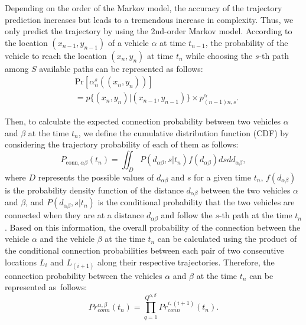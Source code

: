 \documentclass[sensors,article,accept,moreauthors,pdftex]{Definitions/mdpi}
\begin{document}
Depending on the order of the Markov model, the accuracy of the trajectory prediction increases but leads to a tremendous increase in complexity. 
Thus, we only predict the trajectory by using the 2nd-order Markov model.
According to the location $(x_{n-1}, y_{n-1})$ of a vehicle $\alpha$ at time $t_{n-1}$, the probability of the vehicle to reach the location $(x_{n}, y_{n})$ at time $t_{n}$ while choosing the $s$-th path among $S$ available paths can be represented as follows:
\begin{equation}
    \begin{split}
        & \mathrm{Pr}[\alpha^{s}_{n}((x_{n},y_{n}))]\\
        & =p\{(x_{n}, y_{n})\vert (x_{n-1}, y_{n-1})\} \times p^{\alpha}_{(n-1)n, s}.
    \end{split}
\end{equation}

Then, to calculate the expected connection probability between two vehicles $\alpha$ and $\beta$ at the time $t_{n}$, we define the cumulative distribution function (CDF) by considering the trajectory probability of each of them as follows:
\begin{equation}
P_{\mathrm{conn},\alpha\beta}(t_{n}) = \iint_{D} P(d_{\alpha\beta}, s|t_n) f(d_{\alpha\beta})ds dd_{\alpha\beta},
\end{equation}
where $D$ represents the possible values of $d_{\alpha\beta}$ and $s$ for a given time $t_n$, $f(d_{\alpha\beta})$ is the probability density function of the distance $d_{\alpha\beta}$ between the two vehicles $\alpha$ and $\beta$, and $P(d_{\alpha\beta}, s|t_n)$ is the conditional probability that the two vehicles are connected when they are at a distance $d_{\alpha\beta}$ and follow the $s$-th path at the time $t_n$.
Based on this information, the overall probability of the connection between the vehicle $\alpha$ and the vehicle $\beta$ at the time $t_n$ can be calculated using the product of the conditional connection probabilities between each pair of two consecutive locations $L_i$ and $L_{(i+1)}$ along their respective trajectories. Therefore, the connection probability between the vehicles $\alpha$ and $\beta$ at the time $t_n$ can be represented as~follows:
\begin{equation}
Pr^{\alpha, \beta}_{conn}(t_{n}) = \prod_{q=1}^{Q^{\alpha,\beta}} Pr^{i, (i+1)}_{conn}(t_{n}).
\end{equation}
\end{document}

